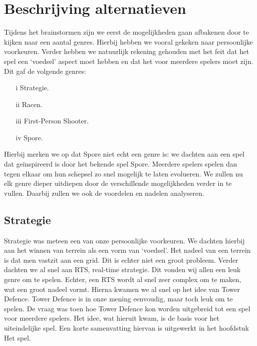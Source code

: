 \section{Beschrijving alternatieven}
Tijdens het brainstormen zijn we eerst de mogelijkheden gaan afbakenen door te kijken naar een aantal genres. Hierbij hebben we vooral gekeken naar persoonlijke voorkeuren. Verder hebben we natuurlijk rekening gehouden met het feit dat het spel een `voedsel' aspect moet hebben en dat het voor meerdere spelers moet zijn. Dit gaf de volgende genres:
\begin{enumerate}
\item[i] Strategie.
\item[ii] Racen.
\item[iii] First-Person Shooter.
\item[iv] Spore.
\end{enumerate}

Hierbij merken we op dat Spore niet echt een genre is: we dachten aan een spel dat ge\"inspireerd is door het bekende spel Spore. Meerdere spelers spelen dan tegen elkaar om hun schepsel zo snel mogelijk te laten evolueren. We zullen nu elk genre dieper uitdiepen door de verschillende mogelijkheden verder in te vullen. Daarbij zullen we ook de voordelen en nadelen analyseren.

\subsection{Strategie}
Strategie was meteen een van onze persoonlijke voorkeuren. We dachten hierbij aan het winnen van terrein als een vorm van `voedsel'. Het nadeel van een terrein is dat men vastzit aan een grid. Dit is echter niet een groot probleem. Verder dachten we al snel aan RTS, real-time strategie. Dit vonden wij allen een leuk genre om te spelen. Echter, een RTS wordt al snel zeer complex om te maken, wat een groot nadeel vormt. Hierna kwamen we al snel op het idee van Tower Defence. Tower Defence is in onze mening eenvoudig, maar toch leuk om te spelen. De vraag was toen hoe Tower Defence kon worden uitgebreid tot een spel voor meerdere spelers. Het idee, wat hieruit kwam, is de basis voor het uiteindelijke spel. Een korte samenvatting hiervan is uitgewerkt in het hoofdstuk Het spel.

